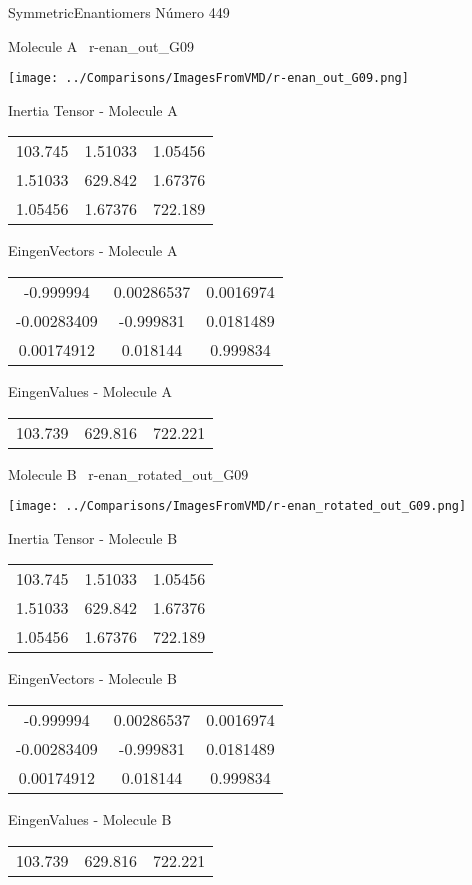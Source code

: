 \vtab[-3cm]
\begin{center}
{\large SymmetricEnantiomers \tab Número 449}
\end{center}
\begin{multicols}{2}
\begin{center}

Molecule A \
r-enan\_out\_G09

\texttt{[image: ../Comparisons/ImagesFromVMD/r-enan\_out\_G09.png]}

Inertia Tensor - Molecule A \\
\begin{tabular}{|c c c|}
103.745	 & 	1.51033	 & 	1.05456	 \\
1.51033	 & 	629.842	 & 	1.67376	 \\
1.05456	 & 	1.67376	 & 	722.189
\end{tabular}

\vtab
 EingenVectors - Molecule A     \\
\begin{tabular}{|c c c|}
-0.999994	 & 	0.00286537	 & 	0.0016974	 \\
-0.00283409	 & 	-0.999831	 & 	0.0181489	 \\
0.00174912	 & 	0.018144	 & 	0.999834
\end{tabular}

\vtab
 EingenValues - Molecule A     \\
\begin{tabular}{|c c c|}
103.739	 & 	629.816	 & 	722.221	 \\
\end{tabular}
\columnbreak

Molecule B \
r-enan\_rotated\_out\_G09

\texttt{[image: ../Comparisons/ImagesFromVMD/r-enan\_rotated\_out\_G09.png]}

Inertia Tensor - Molecule B \\
\begin{tabular}{|c c c|}
103.745	 & 	1.51033	 & 	1.05456	 \\
1.51033	 & 	629.842	 & 	1.67376	 \\
1.05456	 & 	1.67376	 & 	722.189
\end{tabular}

\vtab
 EingenVectors - Molecule B     \\
\begin{tabular}{|c c c|}
-0.999994	 & 	0.00286537	 & 	0.0016974	 \\
-0.00283409	 & 	-0.999831	 & 	0.0181489	 \\
0.00174912	 & 	0.018144	 & 	0.999834
\end{tabular}

\vtab
 EingenValues - Molecule B     \\
\begin{tabular}{|c c c|}
103.739	 & 	629.816	 & 	722.221	 \\
\end{tabular}

\end{center}
\end{multicols}

